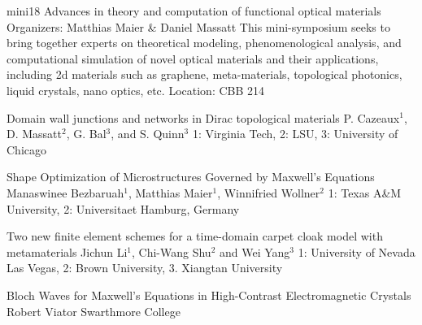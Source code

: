 \mini
{mini18}
{Advances in theory and computation of functional optical materials}
{Organizers: Matthias Maier \& Daniel Massatt}
{This mini-symposium seeks to bring together experts on theoretical modeling, phenomenological analysis, and computational simulation of novel optical materials and their applications, including 2d materials such as graphene, meta-materials, topological photonics, liquid crystals, nano optics, etc.}
{Location: CBB 214}

\begin{talks}
\item\talk
{Domain wall junctions and networks in Dirac topological materials}
{P. Cazeaux$^{1}$, D. Massatt$^{2}$, G. Bal$^3$, and S. Quinn$^3$}
{1: Virginia Tech, 2: LSU, 3: University of Chicago}
\item\talk
{Shape Optimization of Microstructures Governed by Maxwell's Equations}
{Manaswinee Bezbaruah$^{1}$, Matthias Maier$^{1}$, Winnifried Wollner$^{2}$}
{1: Texas A\&M University, 2: Universitaet Hamburg, Germany}
\item\talk
{Two new finite element schemes for a time-domain carpet cloak model with metamaterials}
{Jichun Li$^{1}$, Chi-Wang Shu$^{2}$ and Wei Yang$^{3}$}
{1: University of Nevada Las Vegas, 2: Brown University, 3. Xiangtan University}
\item\talk
{Bloch Waves for Maxwell's Equations in High-Contrast Electromagnetic Crystals}
{Robert Viator}
{Swarthmore College}
\end{talks}
\room
